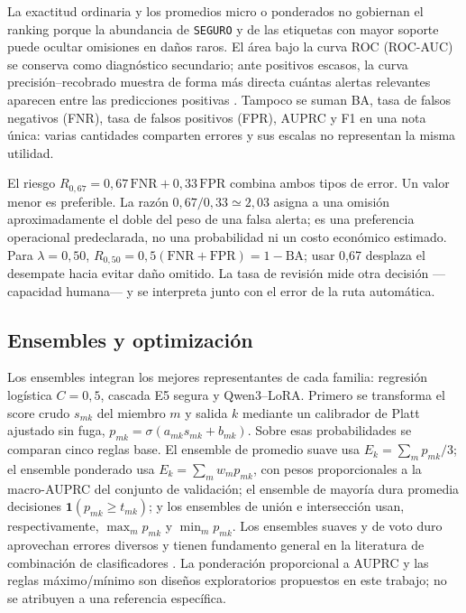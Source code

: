 La exactitud ordinaria y los promedios micro o ponderados no gobiernan el ranking porque la abundancia de \texttt{SEGURO} y de las etiquetas con mayor soporte puede ocultar omisiones en daños raros. El área bajo la curva ROC (ROC-AUC) se conserva como diagnóstico secundario; ante positivos escasos, la curva precisión--recobrado muestra de forma más directa cuántas alertas relevantes aparecen entre las predicciones positivas \cite{saito2015pr,davis2006pr}. Tampoco se suman BA, tasa de falsos negativos (FNR), tasa de falsos positivos (FPR), AUPRC y F1 en una nota única: varias cantidades comparten errores y sus escalas no representan la misma utilidad.

El riesgo $R_{0,67}=0,67\,\mathrm{FNR}+0,33\,\mathrm{FPR}$ combina ambos tipos de error. Un valor menor es preferible. La razón $0,67/0,33\simeq2,03$ asigna a una omisión aproximadamente el doble del peso de una falsa alerta; es una preferencia operacional predeclarada, no una probabilidad ni un costo económico estimado. Para $\lambda=0,50$, $R_{0,50}=0,5(\mathrm{FNR}+\mathrm{FPR})=1-\mathrm{BA}$; usar 0,67 desplaza el desempate hacia evitar daño omitido. La tasa de revisión mide otra decisión ---capacidad humana--- y se interpreta junto con el error de la ruta automática.

\subsection{Ensembles y optimización}

Los ensembles integran los mejores representantes de cada familia: regresión logística $C=0,5$, cascada E5 segura y Qwen3--LoRA. Primero se transforma el score crudo $s_{mk}$ del miembro $m$ y salida $k$ mediante un calibrador de Platt ajustado sin fuga, $p_{mk}=\sigma(a_{mk}s_{mk}+b_{mk})$. Sobre esas probabilidades se comparan cinco reglas base. El ensemble de promedio suave usa $E_k=\sum_m p_{mk}/3$; el ensemble ponderado usa $E_k=\sum_m w_m p_{mk}$, con pesos proporcionales a la macro-AUPRC del conjunto de validación; el ensemble de mayoría dura promedia decisiones $\mathbf{1}(p_{mk}\ge t_{mk})$; y los ensembles de unión e intersección usan, respectivamente, $\max_m p_{mk}$ y $\min_m p_{mk}$. Los ensembles suaves y de voto duro aprovechan errores diversos y tienen fundamento general en la literatura de combinación de clasificadores \cite{dietterich2000ensemble,lam1997majority}. La ponderación proporcional a AUPRC y las reglas máximo/mínimo son diseños exploratorios propuestos en este trabajo; no se atribuyen a una referencia específica.

